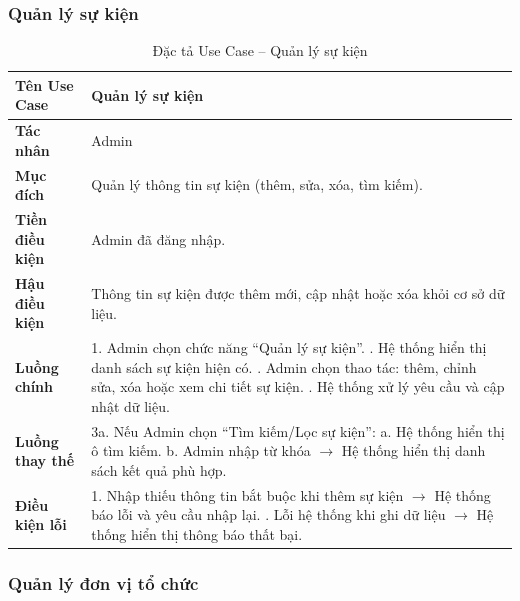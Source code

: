 \subsubsection{Quản lý sự kiện}
\renewcommand{\arraystretch}{1.3}
\setlength{\tabcolsep}{8pt}
\begin{longtable}{|p{}|p{}|}
\caption{Đặc tả Use Case -- Quản lý sự kiện}
\label{tab:uc_manage_event} \\
\hline
\textbf{Tên Use Case} & Quản lý sự kiện \\ \hline
\textbf{Tác nhân} & Admin \\ \hline
\textbf{Mục đích} & Quản lý thông tin sự kiện (thêm, sửa, xóa, tìm kiếm). \\ \hline
\textbf{Tiền điều kiện} & Admin đã đăng nhập. \\ \hline
\textbf{Hậu điều kiện} & Thông tin sự kiện được thêm mới, cập nhật hoặc xóa khỏi cơ sở dữ liệu. \\ \hline
\textbf{Luồng chính} &
1. Admin chọn chức năng “Quản lý sự kiện”. \newline
2. Hệ thống hiển thị danh sách sự kiện hiện có. \newline
3. Admin chọn thao tác: thêm, chỉnh sửa, xóa hoặc xem chi tiết sự kiện. \newline
4. Hệ thống xử lý yêu cầu và cập nhật dữ liệu. \\ \hline
\textbf{Luồng thay thế} &
3a. Nếu Admin chọn “Tìm kiếm/Lọc sự kiện”: \newline
\hspace*{1em}a. Hệ thống hiển thị ô tìm kiếm. \newline
\hspace*{1em}b. Admin nhập từ khóa $\rightarrow$ Hệ thống hiển thị danh sách kết quả phù hợp. \\ \hline
\textbf{Điều kiện lỗi} &
1. Nhập thiếu thông tin bắt buộc khi thêm sự kiện $\rightarrow$ Hệ thống báo lỗi và yêu cầu nhập lại. \newline
2. Lỗi hệ thống khi ghi dữ liệu $\rightarrow$ Hệ thống hiển thị thông báo thất bại. \\ \hline
\end{longtable}
\vspace{15pt}

\subsubsection{Quản lý đơn vị tổ chức}

